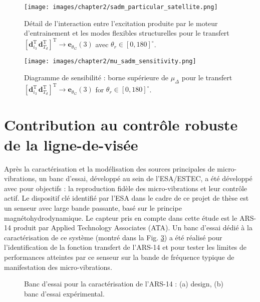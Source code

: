 \begin{figure}[!ht]
\centering
\texttt{[image: images/chapter2/sadm\_particular\_satellite.png]} %
\caption{Détail de l'interaction entre l'excitation produite par le moteur d'entrainement et les modes flexibles structurelles pour le transfert $\left[\mathbf{d}_{i_3}^{\mathrm{T}}\,\mathbf{d}_{T_d}^{\mathrm{T}}\right]^{\mathrm{T}}\rightarrow \mathbf{e}_{\theta_G}(3)$ avec $\theta_r\in\left[0,180\right]^{\circ}$.} 
\label{fig:sadm_particular_satellite_fr}
\end{figure}

\begin{figure}[!th]
\centering
\texttt{[image: images/chapter2/mu\_sadm\_sensitivity.png]} %
\caption{Diagramme de sensibilité : borne supérieure de $\mu_{\Delta}$ pour le transfert $\left[\mathbf{d}_{i_3}^{\mathrm{T}}\,\mathbf{d}_{T_d}^{\mathrm{T}}\right]^{\mathrm{T}}\rightarrow \mathbf{e}_{\theta_G}(3)$ for $\theta_r\in\left[0,180\right]^{\circ}$.} 
\label{fig:mu_sadm_sensitivity_fr}
\end{figure}

\section{Contribution au contr\^ole robuste de la ligne-de-vis\'ee}
Après la caractérisation et la modélisation des sources principales de micro-vibrations, un banc d’essai, développé au sein de l’ESA/ESTEC, a été développé avec pour objectifs : la reproduction fidèle des micro-vibrations et leur contrôle actif. 
Le dispositif clé identifié par l’ESA dans le cadre de ce projet de thèse est un senseur avec large bande passante, basé sur le principe magnétohydrodynamique. Le capteur pris en compte dans cette étude est le ARS-14 produit par Applied Technology Associates (ATA).
Un banc d’essai dédié à la caractérisation de ce système (montré dans la Fig. \ref{fig:banco_ars}) a été réalisé pour l’identification de la fonction transfert de l’ARS-14 et pour tester les limites de performances atteintes par ce senseur sur la bande de fréquence typique de manifestation des micro-vibrations.
\begin{figure}[!h]
\centering
    \quad
\caption{Banc d'essai pour la caractérisation de l'ARS-14 : (a) design, (b) banc d'essai expérimental.}
  \label{fig:banco_ars}
\end{figure}

